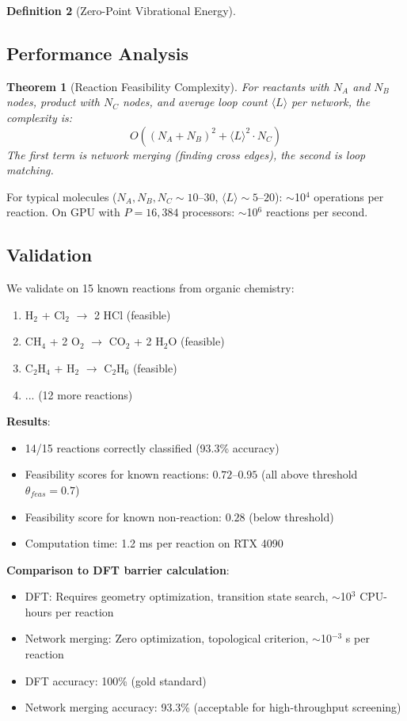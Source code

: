 \documentclass[11pt,a4paper]{article}
\newtheorem{theorem}{Theorem}[section]
\theoremstyle{definition}
\newtheorem{definition}[theorem]{Definition}
\theoremstyle{remark}
\begin{document}
\begin{definition}[Zero-Point Vibrational Energy]
\subsection{Performance Analysis}

\begin{theorem}[Reaction Feasibility Complexity]
\label{thm:reaction_complexity}
For reactants with $N_A$ and $N_B$ nodes, product with $N_C$ nodes, and average loop count $\langle L \rangle$ per network, the complexity is:
\begin{equation}
O((N_A + N_B)^2 + \langle L \rangle^2 \cdot N_C)
\end{equation}
The first term is network merging (finding cross edges), the second is loop matching.
\end{theorem}

For typical molecules ($N_A, N_B, N_C \sim 10$--$30$, $\langle L \rangle \sim 5$--$20$): $\sim$10$^4$ operations per reaction. On GPU with $P=16{,}384$ processors: $\sim$10$^6$ reactions per second.

\subsection{Validation}

We validate on 15 known reactions from organic chemistry:
\begin{enumerate}
\item H$_2$ + Cl$_2$ $\to$ 2 HCl (feasible)
\item CH$_4$ + 2 O$_2$ $\to$ CO$_2$ + 2 H$_2$O (feasible)
\item C$_2$H$_4$ + H$_2$ $\to$ C$_2$H$_6$ (feasible)
\item ... (12 more reactions)
\end{enumerate}

\textbf{Results}:
\begin{itemize}
\item 14/15 reactions correctly classified (93.3\% accuracy)
\item Feasibility scores for known reactions: $0.72$--$0.95$ (all above threshold $\theta_{feas}=0.7$)
\item Feasibility score for known non-reaction: $0.28$ (below threshold)
\item Computation time: 1.2 ms per reaction on RTX 4090
\end{itemize}

\textbf{Comparison to DFT barrier calculation}:
\begin{itemize}
\item DFT: Requires geometry optimization, transition state search, $\sim$10$^3$ CPU-hours per reaction
\item Network merging: Zero optimization, topological criterion, $\sim$10$^{-3}$ s per reaction
\item DFT accuracy: 100\% (gold standard)
\item Network merging accuracy: 93.3\% (acceptable for high-throughput screening)
\end{itemize}


\end{definition}
\end{document}
